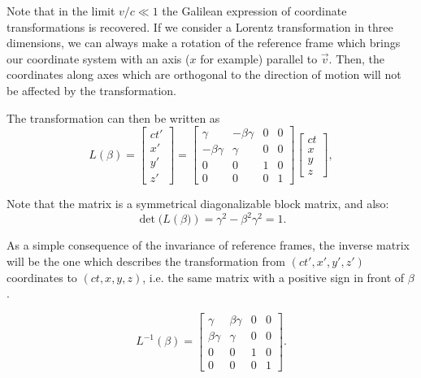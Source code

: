 Note that in the limit $v/c \ll 1$ the Galilean expression of coordinate transformations is recovered. If we consider a Lorentz transformation in three dimensions, we can always make a rotation of the reference frame which brings our coordinate system with an axis ($x$ for example) parallel to $\vec{v}$. Then, the coordinates along axes which are orthogonal to the  direction of motion will not be affected by the transformation. 

The transformation can then be written as
\begin{equation}
  L(\beta)=
  \begin{bmatrix}
    ct'\\
    x'\\
    y'\\
    z'
  \end{bmatrix}
  =
  \begin{bmatrix}
    \gamma & -\beta\gamma & 0 & 0\\
    -\beta\gamma & \gamma & 0 & 0\\
    0 & 0 & 1 & 0\\
    0 & 0 & 0 & 1  
  \end{bmatrix}
  \begin{bmatrix}
    ct\\
    x\\
    y\\
    z
  \end{bmatrix},
\end{equation}

Note that the matrix is a symmetrical diagonalizable block matrix, and also:
\begin{equation}
  \det(L\left(\beta)\right) = \gamma^2 - \beta^2\gamma^2 = 1.
\end{equation}

As a simple consequence of the invariance of reference frames, the inverse matrix will be the one which describes the transformation from $(ct',x',y',z')$ coordinates to $(ct,x,y,z)$, i.e. the same matrix with a positive sign in front of $\beta$.

\begin{equation}
  L^{-1}(\beta)=
  \begin{bmatrix}
    \gamma & \beta\gamma & 0 & 0\\
    \beta\gamma & \gamma & 0 & 0\\
    0 & 0 & 1 & 0\\
    0 & 0 & 0 & 1  
  \end{bmatrix}.
\end{equation}

